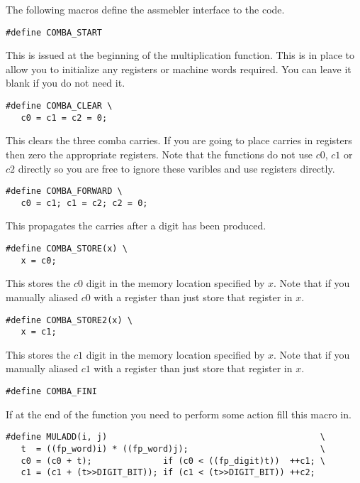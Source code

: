 \documentclass[b5paper]{book}
\begin{document}
The following macros define the assmebler interface to the code.

\begin{verbatim}
#define COMBA_START 
\end{verbatim}

This is issued at the beginning of the multiplication function.  This is in place to allow you to
initialize any registers or machine words required.  You can leave it blank if you do not need 
it.

\begin{verbatim}
#define COMBA_CLEAR \
   c0 = c1 = c2 = 0;
\end{verbatim}

This clears the three comba carries.  If you are going to place carries in registers then 
zero the appropriate registers.  Note that the functions do not use $c0$, $c1$ or $c2$ directly
so you are free to ignore these varibles and use registers directly.

\begin{verbatim}
#define COMBA_FORWARD \
   c0 = c1; c1 = c2; c2 = 0;
\end{verbatim}

This propagates the carries after a digit has been produced.  

\begin{verbatim}
#define COMBA_STORE(x) \
   x = c0;
\end{verbatim}

This stores the $c0$ digit in the memory location specified by $x$.  Note that if you manually 
aliased $c0$ with a register than just store that register in $x$.  

\begin{verbatim}
#define COMBA_STORE2(x) \
   x = c1;
\end{verbatim}

This stores the $c1$ digit in the memory location specified by $x$.  Note that if you manually 
aliased $c1$ with a register than just store that register in $x$.  

\begin{verbatim}
#define COMBA_FINI
\end{verbatim}

If at the end of the function you need to perform some action fill this macro in. 

\begin{verbatim}
#define MULADD(i, j)                                          \
   t  = ((fp_word)i) * ((fp_word)j);                          \
   c0 = (c0 + t);              if (c0 < ((fp_digit)t))  ++c1; \
   c1 = (c1 + (t>>DIGIT_BIT)); if (c1 < (t>>DIGIT_BIT)) ++c2;
\end{verbatim}
\end{document}
